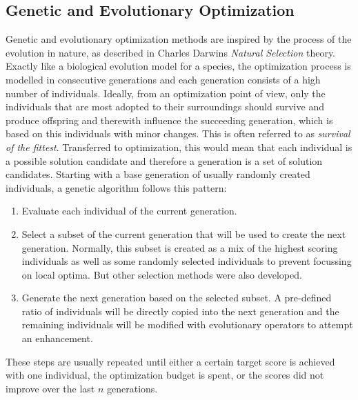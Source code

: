 \subsection{Genetic and Evolutionary Optimization}
\label{sec:theory:optimization:genetic}
Genetic and evolutionary optimization methods are inspired by the process of the evolution in nature, as described in Charles Darwins \textit{Natural Selection} theory.
Exactly like a biological evolution model for a species, the optimization process is modelled in consecutive generations and each generation consists of a high number of individuals.
Ideally, from an optimization point of view, only the individuals that are most adopted to their surroundings should survive and produce offspring and therewith influence the succeeding generation, which is based on this individuals with minor changes.
This is often referred to as \textit{survival of the fittest}.\newline
Transferred to optimization, this would mean that each individual is a possible solution candidate and therefore a generation is a set of solution candidates.
Starting with a base generation of usually randomly created individuals, a genetic algorithm follows this pattern:
\begin{enumerate}
    \item Evaluate each individual of the current generation.
    \item Select a subset of the current generation that will be used to create the next generation. Normally, this subset is created as a mix of the highest scoring individuals as well as some randomly selected individuals to prevent focussing on local optima. But other selection methods were also developed.
    \item Generate the next generation based on the selected subset. A pre-defined ratio of individuals will be directly copied into the next generation and the remaining individuals will be modified with evolutionary operators to attempt an enhancement.
\end{enumerate}
These steps are usually repeated until either a certain target score is achieved with one individual, the optimization budget is spent, or the scores did not improve over the last $n$ generations.

